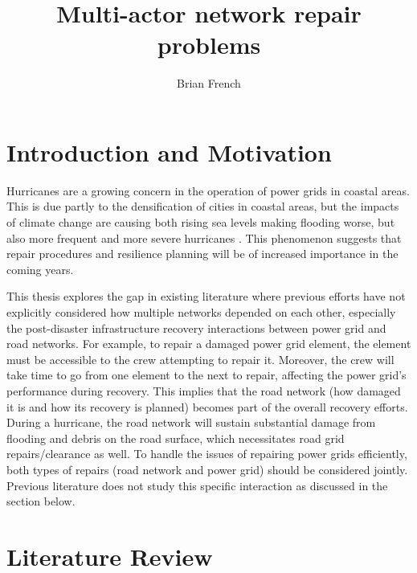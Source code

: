 \documentclass{article}
\begin{document}
	\title{Multi-actor network repair problems}
	\author{Brian French}
	\maketitle
	
	\section{Introduction and Motivation}
	Hurricanes are a growing concern in the operation of power grids in coastal areas. This is due partly to the densification of cities in coastal areas, but the impacts of climate change are causing both rising sea levels making flooding worse, but also more frequent and more severe hurricanes \cite{MannEA2006}. This phenomenon suggests that repair procedures and resilience planning will be of increased importance in the coming years.
	
	This thesis explores the gap in existing literature where previous efforts have not explicitly considered how multiple networks depended on each other, especially the post-disaster infrastructure recovery interactions between power grid and road networks. For example, to repair a damaged power grid element, the element must be accessible to the crew attempting to repair it. Moreover, the crew will take time to go from one element to the next to repair, affecting the power grid's performance during recovery. This implies that the road network (how damaged it is and how its recovery is planned) becomes part of the overall recovery efforts. During a hurricane, the road network will sustain substantial damage from flooding and debris on the road surface, which necessitates road grid repairs/clearance as well. To handle the issues of repairing power grids efficiently, both types of repairs (road network and power grid) should be considered jointly. Previous literature does not study this specific interaction as discussed in the section below.

	\section{Literature Review}
\end{document}

